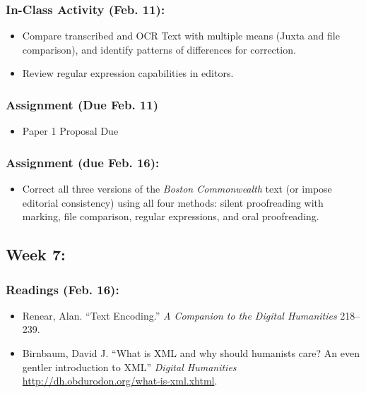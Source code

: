\documentclass[]{article}
\begin{document}
\subsubsection{In-Class Activity (Feb.
11):}\label{in-class-activity-feb.-11}

\begin{itemize}
\itemsep1pt\parskip0pt
\item
  Compare transcribed and OCR Text with multiple means (Juxta and file
  comparison), and identify patterns of differences for correction.
\item
  Review regular expression capabilities in editors.
\end{itemize}

\subsubsection{Assignment (Due Feb. 11)}\label{assignment-due-feb.-11}

\begin{itemize}
\itemsep1pt\parskip0pt
\item
  Paper 1 Proposal Due
\end{itemize}

\subsubsection{Assignment (due Feb. 16):}\label{assignment-due-feb.-16}

\begin{itemize}
\itemsep1pt\parskip0pt
\item
  Correct all three versions of the \emph{Boston Commonwealth} text (or
  impose editorial consistency) using all four methods: silent
  proofreading with marking, file comparison, regular expressions, and
  oral proofreading.
\end{itemize}

\subsection{Week 7:}\label{week-7}

\subsubsection{Readings (Feb. 16):}\label{readings-feb.-16}

\begin{itemize}
\itemsep1pt\parskip0pt
\item
  Renear, Alan. ``Text Encoding.'' \emph{A Companion to the Digital
  Humanities} 218--239.
\item
  Birnbaum, David J. ``What is XML and why should humanists care? An
  even gentler introduction to XML'' \emph{Digital Humanities}
  \url{http://dh.obdurodon.org/what-is-xml.xhtml}.
\end{itemize}
\end{document}
